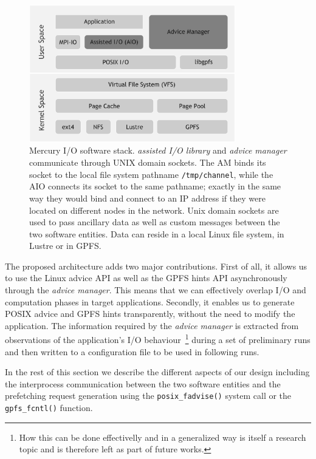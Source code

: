 \begin{figure}[!htb]
  \centering
  \includegraphics[width=0.8\textwidth]{figures/linux-software-stack-ext}
  \caption{Mercury I/O software stack. \textit{assisted I/O library} and \textit{advice manager} communicate through UNIX domain sockets. The AM binds its socket to the local file system pathname \texttt{/tmp/channel}, while the AIO connects its 
  socket to the same pathname; exactly in the same way they would bind and connect to an IP address if they were located on different nodes in the network. Unix domain sockets are used to pass ancillary data as well as custom messages between the 
  two software entities. Data can reside in a local Linux file system, in Lustre or in GPFS.}
  \label{figure: softwarestack}
\end{figure}

The proposed architecture adds two major contributions. First of all, it allows us to use the Linux advice API as well as the GPFS hints API asynchronously through the \textit{advice manager}. This means that we can effectively overlap I/O and 
computation phases in target applications. Secondly, it enables us to generate POSIX advice and GPFS hints transparently, without the need to modify the application. The information required by the \textit{advice manager} is extracted from 
observations of the application's I/O behaviour~\footnote{How this can be done effectivelly and in a generalized way is itself a research topic and is therefore left as part of future works.} during a set of preliminary runs and then written to 
a configuration file to be used in following runs.

In the rest of this section we describe the different aspects of our design including the interprocess communication between the two software entities and the prefetching request generation using the \texttt{posix\_fadvise()} system call or the 
\texttt{gpfs\_fcntl()} function.


